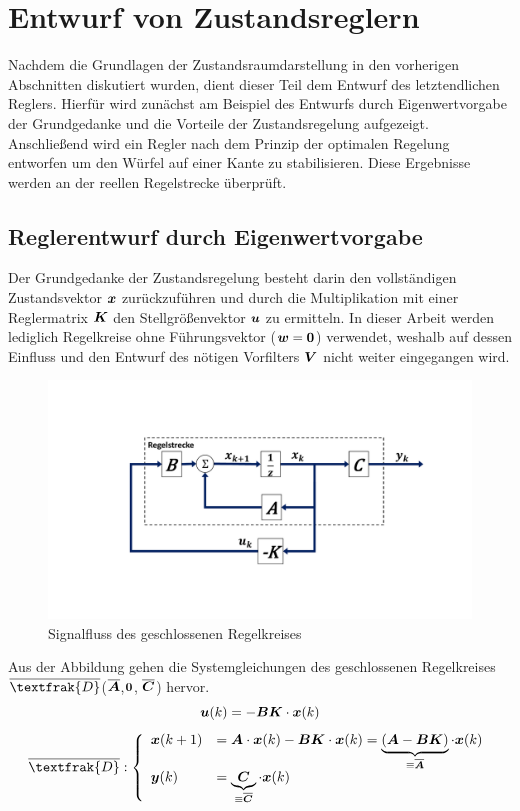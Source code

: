 \section{Entwurf von Zustandsreglern}
Nachdem die Grundlagen der Zustandsraumdarstellung in den vorherigen Abschnitten diskutiert wurden, dient dieser Teil dem Entwurf des letztendlichen Reglers. Hierfür wird zunächst am Beispiel des Entwurfs durch Eigenwertvorgabe der Grundgedanke und die Vorteile der Zustandsregelung aufgezeigt. Anschließend wird ein Regler nach dem Prinzip der optimalen Regelung entworfen um den Würfel auf einer Kante zu stabilisieren. Diese Ergebnisse werden an der reellen Regelstrecke überprüft.

\subsection{Reglerentwurf durch Eigenwertvorgabe}
Der Grundgedanke der Zustandsregelung besteht darin den vollständigen Zustandsvektor $\boldsymbol{x}$ zurückzuführen und durch die Multiplikation mit einer Reglermatrix $\boldsymbol{K}$ den Stellgrößenvektor $\boldsymbol{u}$ zu ermitteln. In dieser Arbeit werden lediglich Regelkreise ohne Führungsvektor ($\boldsymbol{w}=\boldsymbol{0}$) verwendet, weshalb auf dessen Einfluss und den Entwurf des nötigen Vorfilters $\boldsymbol{V}$ nicht weiter eingegangen wird.
\begin{figure}[H]
\centering
\includegraphics[width=0.8\linewidth, trim={3.5cm 3.5cm 3.5cm 3.5cm}, clip]{img/RT_ClosedLoop}
\caption{Signalfluss des geschlossenen Regelkreises}
\end{figure}
Aus der Abbildung gehen die Systemgleichungen des geschlossenen Regelkreises $\overline{\textfrak{D}}$($\overline{\boldsymbol{A}}$,$\boldsymbol{0}$, $\overline{\boldsymbol{C}}$) hervor.
\begin{equation}
\boldsymbol{u}(k) = -\boldsymbol{B}\boldsymbol{K}\cdot\boldsymbol{x}(k)
\end{equation}
\begin{equation}
\overline{\textfrak{D}}
: \left\{ \begin{array}{ll}
\bs{{x}}(k+1) &= \bs{A}\cdot \bs{x}(k) - \bs{B}\bs{K}\cdot \bs{x}(k) = \underbrace{(\bs{A}-\bs{B}\bs{K})}_{\equiv \bs{\overline{A}}}\cdot \bs{x}(k) \\
\bs{y}(k) &= \underbrace{\bs{C}}_{\equiv \bs{\overline{C}}}\cdot \bs{x}(k)
\end{array}
\right.
\end{equation}

